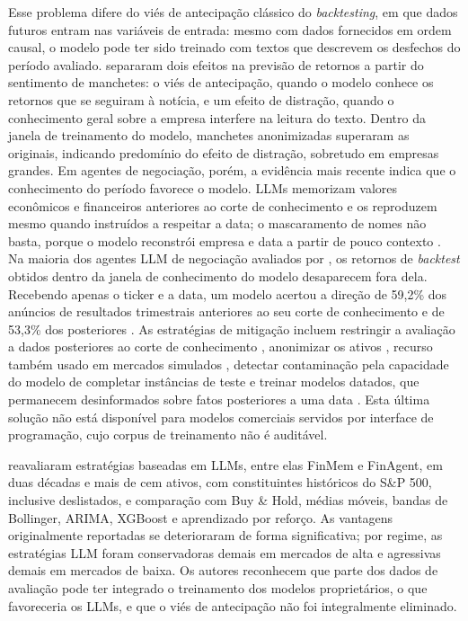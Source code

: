 Esse problema difere do viés de antecipação clássico do \textit{backtesting}, em que dados futuros entram nas variáveis de entrada: mesmo com dados fornecidos em ordem causal, o modelo pode ter sido treinado com textos que descrevem os desfechos do período avaliado. \citet{Glasserman2023} separaram dois efeitos na previsão de retornos a partir do sentimento de manchetes: o viés de antecipação, quando o modelo conhece os retornos que se seguiram à notícia, e um efeito de distração, quando o conhecimento geral sobre a empresa interfere na leitura do texto. Dentro da janela de treinamento do modelo, manchetes anonimizadas superaram as originais, indicando predomínio do efeito de distração, sobretudo em empresas grandes. Em agentes de negociação, porém, a evidência mais recente indica que o conhecimento do período favorece o modelo. LLMs memorizam valores econômicos e financeiros anteriores ao corte de conhecimento e os reproduzem mesmo quando instruídos a respeitar a data; o mascaramento de nomes não basta, porque o modelo reconstrói empresa e data a partir de pouco contexto \citep{LopezLira2025}. Na maioria dos agentes LLM de negociação avaliados por \citet{ProfitMirage2025}, os retornos de \textit{backtest} obtidos dentro da janela de conhecimento do modelo desaparecem fora dela. Recebendo apenas o ticker e a data, um modelo acertou a direção de 59,2\% dos anúncios de resultados trimestrais anteriores ao seu corte de conhecimento e de 53,3\% dos posteriores \citep{Wang2026}. As estratégias de mitigação incluem restringir a avaliação a dados posteriores ao corte de conhecimento \citep{LopezLira2023}, anonimizar os ativos \citep{Glasserman2023}, recurso também usado em mercados simulados \citep{StockAgent2024}, detectar contaminação pela capacidade do modelo de completar instâncias de teste \citep{Golchin2024} e treinar modelos datados, que permanecem desinformados sobre fatos posteriores a uma data \citep{Drinkall2024}. Esta última solução não está disponível para modelos comerciais servidos por interface de programação, cujo corpus de treinamento não é auditável.

\citet{FINSABER2026} reavaliaram estratégias baseadas em LLMs, entre elas FinMem e FinAgent, em duas décadas e mais de cem ativos, com constituintes históricos do S\&P 500, inclusive deslistados, e comparação com Buy \& Hold, médias móveis, bandas de Bollinger, ARIMA, XGBoost e aprendizado por reforço. As vantagens originalmente reportadas se deterioraram de forma significativa; por regime, as estratégias LLM foram conservadoras demais em mercados de alta e agressivas demais em mercados de baixa. Os autores reconhecem que parte dos dados de avaliação pode ter integrado o treinamento dos modelos proprietários, o que favoreceria os LLMs, e que o viés de antecipação não foi integralmente eliminado.

